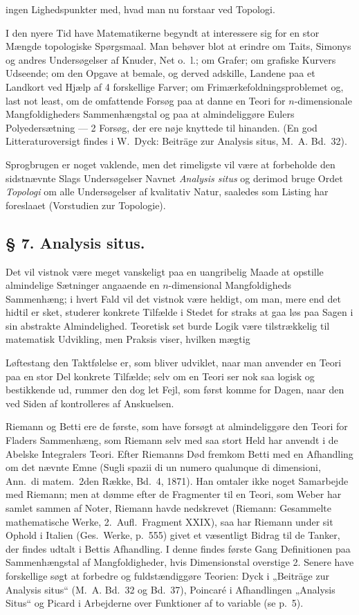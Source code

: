 \documentclass{article}
\begin{document}
ingen Lighedspunkter med, hvad man nu forstaar ved Topologi.

I den nyere Tid have Matematikerne begyndt at interessere sig for en stor Mængde topologiske Spørgsmaal. Man behøver blot at erindre om Taits, Simonys og andres Undersøgelser af Knuder, Net o.~l.; om Grafer; om grafiske Kurvers Udseende; om den Opgave at bemale, og derved adskille, Landene paa et Landkort ved Hjælp af 4 forskellige Farver; om Frimærkefoldningsproblemet og, last not least, om de omfattende Forsøg paa at danne en Teori for $n$-dimensionale Mangfoldigheders Sammenhængstal og paa at almindeliggøre Eulers Polyedersætning --- 2 Forsøg, der ere nøje knyttede til hinanden. (En god Litteraturoversigt findes i W.~Dyck: Beiträge zur Analysis situs, M.~A. Bd.\ 32).

Sprogbrugen er noget vaklende, men det rimeligste vil være at forbeholde den sidstnævnte Slags Undersøgelser Navnet \emph{Analysis situs} og derimod bruge Ordet \emph{Topologi} om alle Undersøgelser af kvalitativ Natur, saaledes som Listing har foreslaaet (Vorstudien zur Topologie).

\subsection*{§ 7. Analysis situs.}

Det vil vistnok være meget vanskeligt paa en uangribelig Maade at opstille almindelige Sætninger angaaende en $n$-dimensional Mangfoldigheds Sammenhæng; i hvert Fald vil det vistnok være heldigt, om man, mere end det hidtil er sket, studerer konkrete Tilfælde i Stedet for straks at gaa løs paa Sagen i sin abstrakte Almindelighed. Teoretisk set burde Logik være tilstrækkelig til matematisk Udvikling, men Praksis viser, hvilken mægtig

Løftestang den Taktfølelse er, som bliver udviklet, naar man anvender en Teori paa en stor Del konkrete Tilfælde; selv om en Teori ser nok saa logisk og bestikkende ud, rummer den dog let Fejl, som først komme for Dagen, naar den ved Siden af kontrolleres af Anskuelsen.

Riemann og Betti ere de første, som have forsøgt at almindeliggøre den Teori for Fladers Sammenhæng, som Riemann selv med saa stort Held har anvendt i de Abelske Integralers Teori. Efter Riemanns Død fremkom Betti med en Afhandling om det nævnte Emne (Sugli spazii di un numero qualunque di dimensioni, Ann.\ di matem.\ 2den Række, Bd.\ 4, 1871). Han omtaler ikke noget Samarbejde med Riemann; men at dømme efter de Fragmenter til en Teori, som Weber har samlet sammen af Noter, Riemann havde nedskrevet (Riemann: Gesammelte mathematische Werke, 2.\ Aufl.\ Fragment XXIX), saa har Riemann under sit Ophold i Italien (Ges.\ Werke, p.\ 555) givet et væsentligt Bidrag til de Tanker, der findes udtalt i Bettis Afhandling. I denne findes første Gang Definitionen paa Sammenhængstal af Mangfoldigheder, hvis Dimensionstal overstige 2. Senere have forskellige søgt at forbedre og fuldstændiggøre Teorien: Dyck i „Beiträge zur Analysis situs“ (M.~A. Bd.\ 32 og Bd.\ 37), Poincaré i Afhandlingen „Analysis Situs“ og Picard i Arbejderne over Funktioner af to variable (se p.\ 5).
\end{document}
